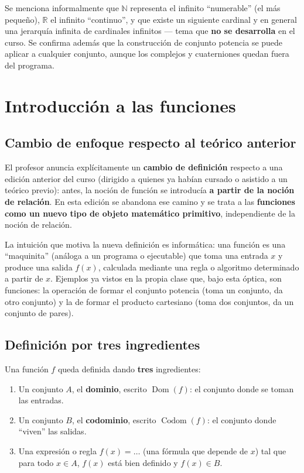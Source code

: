 \documentclass[12pt,a4paper]{article}
\begin{document}
\begin{notebox}
Se menciona informalmente que $\mathbb N$ representa el infinito ``numerable'' (el más pequeño), $\mathbb R$ el infinito ``continuo'', y que existe un siguiente cardinal y en general una jerarquía infinita de cardinales infinitos — tema que \textbf{no se desarrolla} en el curso. Se confirma además que la construcción de conjunto potencia se puede aplicar a cualquier conjunto, aunque los complejos y cuaterniones quedan fuera del programa.
\end{notebox}

\section{Introducción a las funciones}

\subsection{Cambio de enfoque respecto al teórico anterior}

El profesor anuncia explícitamente un \textbf{cambio de definición} respecto a una edición anterior del curso (dirigido a quienes ya habían cursado o asistido a un teórico previo): antes, la noción de función se introducía \textbf{a partir de la noción de relación}. En esta edición se abandona ese camino y se trata a las \textbf{funciones como un nuevo tipo de objeto matemático primitivo}, independiente de la noción de relación.

La intuición que motiva la nueva definición es informática: una función es una ``maquinita'' (análoga a un programa o ejecutable) que toma una entrada $x$ y produce una salida $f(x)$, calculada mediante una regla o algoritmo determinado a partir de $x$. Ejemplos ya vistos en la propia clase que, bajo esta óptica, son funciones: la operación de formar el conjunto potencia (toma un conjunto, da otro conjunto) y la de formar el producto cartesiano (toma dos conjuntos, da un conjunto de pares).

\subsection{Definición por tres ingredientes}

Una función $f$ queda definida dando \textbf{tres} ingredientes:

\begin{enumerate}
  \item Un conjunto $A$, el \textbf{dominio}, escrito $\operatorname{Dom}(f)$: el conjunto donde se toman las entradas.
  \item Un conjunto $B$, el \textbf{codominio}, escrito $\operatorname{Codom}(f)$: el conjunto donde ``viven'' las salidas.
  \item Una expresión o regla $f(x) = \dots$ (una fórmula que depende de $x$) tal que para todo $x \in A$, $f(x)$ está bien definido y $f(x) \in B$.
\end{enumerate}
\end{document}

